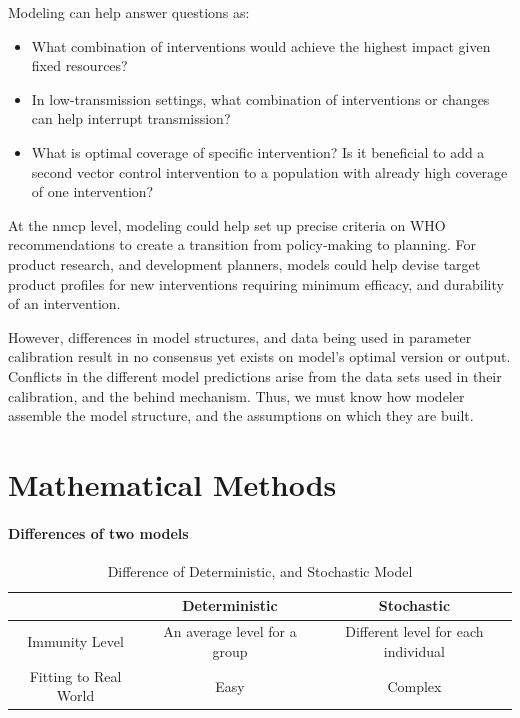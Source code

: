 \documentclass[a4paper, 12pt, twoside]{article}
\begin{document}
Modeling can help answer questions as:

\begin{itemize}
	\item What combination of interventions would achieve the highest impact given fixed resources?
	\item In low-transmission settings, what combination of interventions or changes can help interrupt transmission?
	\item What is optimal coverage of specific intervention? Is it beneficial to add a second vector control intervention to a population with already high coverage of one intervention?
\end{itemize}

At the \gls{nmcp} level, modeling could help set up precise criteria on WHO recommendations to create a transition from policy-making to planning. For product research, and development planners, models could help devise target product profiles for new interventions requiring minimum efficacy, and durability of an intervention.

However, differences in model structures, and data being used in parameter calibration result in no consensus yet exists on model's optimal version or output.
Conflicts in the different model predictions arise from the data sets used in their calibration, and the behind mechanism.
Thus, we must know how modeler assemble the model structure, and the assumptions on which they are built.

\section{Mathematical Methods}

\paragraph{Differences of two models}%
\label{par:differences_of_two_models}

\begin{table}[ht]
	\centering
	\label{tab:difference}
	\begin{tabular}{c c c}
		\toprule
		                      & Deterministic                & Stochastic                          \\
		\midrule
		Immunity Level        & An average level for a group & Different level for each individual \\
		Fitting to Real World & Easy                         & Complex                             \\
		\bottomrule
	\end{tabular}
	\caption{Difference of Deterministic, and Stochastic Model}
\end{table}
\end{document}
